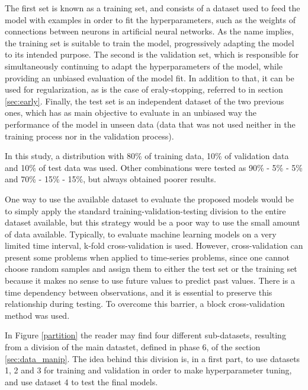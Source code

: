 The first set is known as a training set, and consists of a dataset used to feed the model with examples in order to fit the hyperparameters, such as the weights of connections between neurons in artificial neural networks. As the name implies, the training set is suitable to train the model, progressively adapting the model to its intended purpose. The second is the validation set, which is responsible for simultaneously continuing to adapt the hyperparameters of the model, while providing an unbiased evaluation of the model fit. In addition to that, it can be used for regularization, as is the case of eraly-stopping, referred to in section \ref{sec:early}. Finally, the test set is an independent dataset of the two previous ones, which has as main objective to evaluate in an unbiased way the performance of the model in unseen data (data that was not used neither in the training process nor in the validation process). 

In this study, a distribution with 80\% of training data, 10\% of validation data and 10\% of test data was used. Other combinations were tested as 90\% - 5\% - 5\% and 70\% - 15\% - 15\%, but always obtained poorer results. 

One way to use the available dataset to evaluate the proposed models would be to simply apply the standard training-validation-testing division to the entire dataset available, but this strategy would be a poor way to use the small amount of data available. Typically, to evaluate machine learning models on a very limited time interval, k-fold cross-validation is used. However, cross-validation can present some problems when applied to time-series problems, since one cannot choose random samples and assign them to either the test set or the training set because it makes no sense to use future values to predict past values. There is a time dependency between observations, and it is essential to preserve this relationship during testing. To overcome this barrier, a block cross-validation method was used.

In Figure \ref{partition} the reader may find four different sub-datasets, resulting from a division of the main datastet, defined in phase 6, of the section \ref{sec:data_manip}. The idea behind this division is, in a first part, to use datasets 1, 2 and 3 for training and validation in order to make hyperparameter tuning, and use dataset 4 to test the final models.

